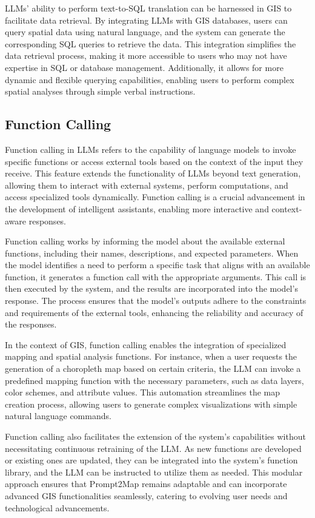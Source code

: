 LLMs' ability to perform text-to-SQL translation can be harnessed in GIS to facilitate data retrieval. By integrating LLMs with GIS databases, users can query spatial data using natural language, and the system can generate the corresponding SQL queries to retrieve the data. This integration simplifies the data retrieval process, making it more accessible to users who may not have expertise in SQL or database management. Additionally, it allows for more dynamic and flexible querying capabilities, enabling users to perform complex spatial analyses through simple verbal instructions.

\subsection{Function Calling}

Function calling in LLMs refers to the capability of language models to invoke specific functions or access external tools based on the context of the input they receive. This feature extends the functionality of LLMs beyond text generation, allowing them to interact with external systems, perform computations, and access specialized tools dynamically. Function calling is a crucial advancement in the development of intelligent assistants, enabling more interactive and context-aware responses.

Function calling works by informing the model about the available external functions, including their names, descriptions, and expected parameters. When the model identifies a need to perform a specific task that aligns with an available function, it generates a function call with the appropriate arguments. This call is then executed by the system, and the results are incorporated into the model's response. The process ensures that the model's outputs adhere to the constraints and requirements of the external tools, enhancing the reliability and accuracy of the responses.

In the context of GIS, function calling enables the integration of specialized mapping and spatial analysis functions. For instance, when a user requests the generation of a choropleth map based on certain criteria, the LLM can invoke a predefined mapping function with the necessary parameters, such as data layers, color schemes, and attribute values. This automation streamlines the map creation process, allowing users to generate complex visualizations with simple natural language commands.

Function calling also facilitates the extension of the system's capabilities without necessitating continuous retraining of the LLM. As new functions are developed or existing ones are updated, they can be integrated into the system's function library, and the LLM can be instructed to utilize them as needed. This modular approach ensures that Prompt2Map remains adaptable and can incorporate advanced GIS functionalities seamlessly, catering to evolving user needs and technological advancements.

